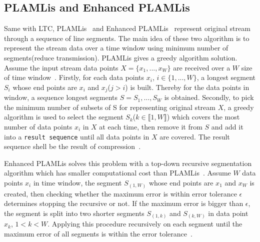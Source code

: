 \subsection{PLAMLis and Enhanced PLAMLis}
Same with LTC, PLAMLis~\cite{liu2007energy} and Enhanced
PLAMLis~\cite{pham2008enhance} represent original stream through a sequence of
line segments. The main idea of these two algorithm is to represent the stream
data over a time window using minimum number of segments(reduce transmission).
PLAMLis gives a greedy algorithm solution. Assume the input stream data points
$X=\{x_1, ..., x_W\}$ are received over a $W$ size of time
window~\cite{liu2007energy, zordan2014performance}. Firstly, for each data
points $x_i$, $i \in \{1, ..., W\}$, a longest segment $S_{i}$ whose end points
are $x_i$ and $x_j$($j>i$) is built. Thereby for the data points in window, a
sequence longest segments $S = {S_1, ..., S_W}$ is obtained. Secondly, to pick
the minimum number of subsets of S for representing original stream $X$, a
greedy algorithm is used to select the segment $S_k$($k \in \llbracket1,
W\rrbracket$) which covers the most number of data points $x_i$ in $X$ at each
time, then remove it from $S$ and add it into a \texttt{result sequence} until
all data points in $X$ are covered. The result sequence shell be the result of
compression~\cite{zordan2012compress, zordan2014performance}.

Enhanced PLAMLis solves this problem with a top-down recursive segmentation
algorithm which has smaller computational cost than
PLAMLis~\cite{pham2008enhance, zordan2014performance}. Assume $W$ data points
$x_i$ in time window, the segment $S_{(1, W)}$ whose end points are $x_1$ and
$x_W$ is created, then checking whether the maximum error is within error
tolerance $\epsilon$ determines stopping the recursive or not. If the maximum
error is bigger than $\epsilon$, the segment is split into two shorter segments
$S_{(1, k)}$ and $S_{(k, W)}$ in data point $x_k$, $1<k<W$. Applying this
procedure recursively on each segment until the maximum error of all segments is
within the error tolerance~\cite{pham2008enhance, zordan2014performance}.


